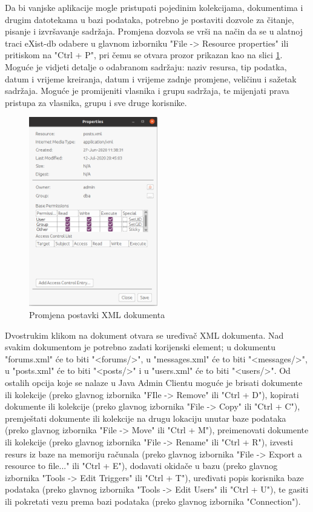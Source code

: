 \documentclass{foi}
\begin{document}
Da bi vanjske aplikacije mogle pristupati pojedinim kolekcijama, dokumentima i drugim datotekama u bazi podataka, potrebno je postaviti dozvole za čitanje, pisanje i izvršavanje sadržaja. Promjena dozvola se vrši na način da se u alatnoj traci eXist-db odabere u glavnom izborniku "File -> Resource properties" ili pritiskom na "Ctrl + P", pri čemu se otvara prozor prikazan kao na slici \ref{properties}. Moguće je vidjeti detalje o odabranom sadržaju: naziv resursa, tip podatka, datum i vrijeme kreiranja, datum i vrijeme zadnje promjene, veličinu i sažetak sadržaja. Moguće je promijeniti vlasnika i grupu sadržaja, te mijenjati prava pristupa za vlasnika, grupu i sve druge korisnike.

\begin{figure}[h!]
    \centering
    \includegraphics[width=0.5\textwidth]{slike/postavke-dokumenta.png}
    \caption{Promjena postavki XML dokumenta}
    \label{properties}
\end{figure}

Dvostrukim klikom na dokument otvara se uređivač XML dokumenta. Nad svakim dokumentom je potrebno zadati korijenski element; u dokumentu "forums.xml" će to biti "<forums/>", u "messages.xml" će to biti "<messages/>", u "posts.xml" će to biti "<posts/>" i u "users.xml" će to biti "<users/>". Od ostalih opcija koje se nalaze u Java Admin Clientu moguće je brisati dokumente ili kolekcije (preko glavnog izbornika "FIle -> Remove" ili "Ctrl + D"), kopirati dokumente ili kolekcije (preko glavnog izbornika "File -> Copy" ili "Ctrl + C"), premještati dokumente ili kolekcije na drugu lokaciju unutar baze podataka (preko glavnog izbornika "File -> Move" ili "Ctrl + M"), preimenovati dokumente ili kolekcije (preko glavnog izbornika "File -> Rename" ili "Ctrl + R"), izvesti resurs iz baze na memoriju računala (preko glavnog izbornika "File -> Export a resource to file..." ili "Ctrl + E"), dodavati okidače u bazu (preko glavnog izbornika "Tools -> Edit Triggers" ili "Ctrl + T"), uređivati popis korisnika baze podataka (preko glavnog izbornika "Tools -> Edit Users" ili "Ctrl + U"), te gasiti ili pokretati vezu prema bazi podataka (preko glavnog izbornika "Connection").  \cite{exist}
\end{document}
